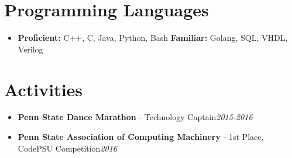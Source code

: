 \documentclass[letterpaper,11pt]{article}
\newcommand{\resumeItemWithDate}[2]{
  \item[]\small{
    {#1}\hfill\textit{#2}\vspace{-6pt}
  }
}
\newcommand{\resumeSubHeadingListStart}{\begin{itemize}[leftmargin=*]}
\newcommand{\resumeSubHeadingListEnd}{\end{itemize}}
\begin{document}
%
\section{Programming Languages}
 \resumeSubHeadingListStart
   \item[]{
     \textbf{Proficient:}{ C++, C, Java, Python, Bash}
     \hfill
     \textbf{Familiar:}{ Golang, SQL, VHDL, Verilog }
   }
 \resumeSubHeadingListEnd
 
\section{Activities}
 \resumeSubHeadingListStart
    \resumeItemWithDate{\textbf{Penn State Dance Marathon} - Technology Captain}{2015-2016}
    \resumeItemWithDate{\textbf{Penn State Association of Computing Machinery} - 1st Place, CodePSU Competition}{2016}
 \resumeSubHeadingListEnd
\end{document}
